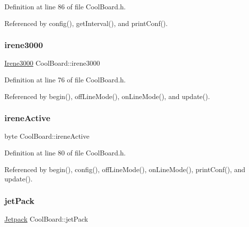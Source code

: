 Definition at line 86 of file Cool\+Board.\+h.



Referenced by config(), get\+Interval(), and print\+Conf().

\mbox{\label{classCoolBoard_ad103718ce316006c4695b8eb312eaf11}} 
\subsubsection{\texorpdfstring{irene3000}{irene3000}}
{\footnotesize\ttfamily \hyperlink{classIrene3000}{Irene3000} Cool\+Board\+::irene3000\hspace{0.3cm}{\ttfamily [private]}}



Definition at line 76 of file Cool\+Board.\+h.



Referenced by begin(), off\+Line\+Mode(), on\+Line\+Mode(), and update().

\mbox{\label{classCoolBoard_a1de9b5516695b2e1668bf2e3a6701332}} 
\subsubsection{\texorpdfstring{irene\+Active}{ireneActive}}
{\footnotesize\ttfamily byte Cool\+Board\+::irene\+Active\hspace{0.3cm}{\ttfamily [private]}}



Definition at line 80 of file Cool\+Board.\+h.



Referenced by begin(), config(), off\+Line\+Mode(), on\+Line\+Mode(), print\+Conf(), and update().

\mbox{\label{classCoolBoard_a30b1357881b01ccbec676856a91e48e9}} 
\subsubsection{\texorpdfstring{jet\+Pack}{jetPack}}
{\footnotesize\ttfamily \hyperlink{classJetpack}{Jetpack} Cool\+Board\+::jet\+Pack\hspace{0.3cm}{\ttfamily [private]}}



